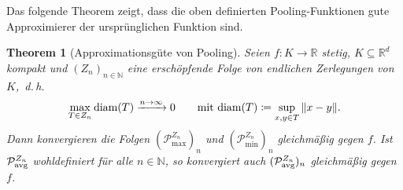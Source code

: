 \documentclass[paper=a4, 	%
		fontsize=11pt,
		abstract=true, 	%
		headsepline, 	%
		notitlepage	%
		]{scrartcl}
\newtheorem{theorem}{Theorem}[section]
\theoremstyle{definition}
\newcommand{\R}{\mathbb{R}}
\newcommand{\N}{\mathbb{N}}
\newcommand{\norm}[1]{\left\lVert#1\right\rVert}
\newcommand{\avg}{\textnormal{avg}}
\newcommand{\diam}{\textnormal{diam}}
\begin{document}
Das folgende Theorem zeigt, dass die oben definierten Pooling-Funktionen gute Approximierer der ursprünglichen Funktion sind.

\begin{theorem}[Approximationsgüte von Pooling]
    Seien $f:K \rightarrow \R$ stetig, $K\subseteq \R^d$ kompakt und $(Z_n)_{n\in\N}$ eine erschöpfende Folge von endlichen Zerlegungen von $K$,~d.\,h. 
    \[
        \max_{T\in Z_n} \diam(T) \xrightarrow{n\rightarrow\infty} 0 \qquad \text{mit $\diam(T)\coloneqq \sup_{x,y\in T} \norm{x - y}$}.
    \]
    Dann konvergieren die Folgen $(\mathcal{P}^{Z_n}_{\max})_n$ und $(\mathcal{P}^{Z_n}_{\min})_n$ gleichmäßig gegen $f$.
    Ist $\mathcal{P}^{Z_n}_{\avg}$ wohldefiniert für alle $n\in\N$, so konvergiert auch $(\mathcal{P}^{Z_n}_{\avg})_n$ gleichmäßig gegen $f$.
\end{theorem}
\end{document}
